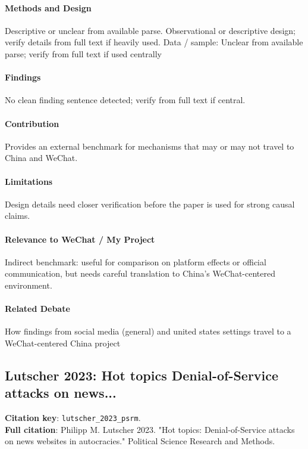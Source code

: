 \documentclass[12pt]{article}
\begin{document}
\paragraph{Methods and Design} Descriptive or unclear from available parse. Observational or descriptive design; verify details from full text if heavily used. Data / sample: Unclear from available parse; verify from full text if used centrally

\paragraph{Findings} No clean finding sentence detected; verify from full text if central.

\paragraph{Contribution} Provides an external benchmark for mechanisms that may or may not travel to China and WeChat.

\paragraph{Limitations} Design details need closer verification before the paper is used for strong causal claims.

\paragraph{Relevance to WeChat / My Project} Indirect benchmark: useful for comparison on platform effects or official communication, but needs careful translation to China's WeChat-centered environment.

\paragraph{Related Debate} How findings from social media (general) and united states settings travel to a WeChat-centered China project


\subsection{Lutscher 2023: Hot topics Denial-of-Service attacks on news...}
\textbf{Citation key}: \texttt{lutscher\_2023\_psrm}.\\
\textbf{Full citation}: Philipp M. Lutscher 2023. "Hot topics: Denial-of-Service attacks on news websites in autocracies." Political Science Research and Methods.
\end{document}
